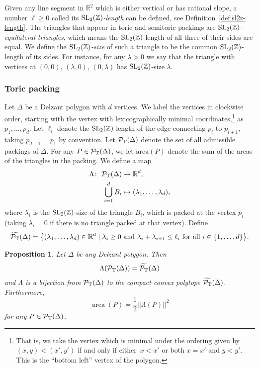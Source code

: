 \documentclass[10pt,a4paper]{amsart}
\numberwithin{equation}{section}
\newtheorem{Proposition}[Theorem]{Proposition}
\def\R{{\mathbb R}}
\def\Z{{\mathbb Z}}
\newcommand{\De}{\Delta}
\newcommand{\area}{\operatorname{area}}
\newcommand{\PT}{\mathcal{P}_{\rm T}}
\newcommand{\PTtilde}{\widetilde{\PT}}
\newcommand{\SL}{{\rm SL}_2(\Z)}
\theoremstyle{definition}
\theoremstyle{plain}
\theoremstyle{plain}
\begin{document}
Given any line segment in $\R^2$ which is either vertical or has rational slope, a number $\ell\geq 0$ called its \emph{$\SL$-length} can be defined, see Definition~\ref{def:sl2z-length}.
The triangles that appear in toric and semitoric packings are \emph{$\SL$-equilateral triangles}, which means the $\SL$-length of all three of their sides are equal. We define the \emph{$\SL$-size} of such a triangle to be the common $\SL$-length of its sides. For instance, for any $\lambda>0$ we say that the triangle with vertices at $(0,0)$, $(\lambda,0)$, $(0,\lambda)$ has $\SL$-size $\lambda$.

\subsubsection{Toric packing}
Let $\De$ be a Delzant polygon with $d$ vertices.
We label the vertices in clockwise order, starting with the vertex with lexicographically minimal coordinates,\footnote{That is, we take the vertex which is minimal under the ordering given by $(x,y)<(x',y')$ if and only if either~$x<x'$ or both $x=x'$ and $y< y'$. This is the ``bottom left'' vertex of the polygon.} as $p_1,\ldots,p_d$.
Let $\ell_i$ denote the $\SL$-length of the edge connecting $p_i$ to $p_{i+1}$, taking $p_{d+1} = p_1$ by convention.
Let $\PT(\De)$ denote the set of all admissible packings of $\De$.
For any $P\in\PT(\De)$, we let $\textrm{area}(P)$ denote the sum of the areas of the triangles in the packing.
We define a map
 \begin{align} \Lambda \colon\ \PT(\De) & \to \R^d, \label{eqn:Lambda} \\ \bigcup_{i=1}^d B_i & \mapsto (\lambda_1,\ldots, \lambda_d),\nonumber
\end{align}
 where $\lambda_i$ is the $\SL$-size of the triangle $B_i$, which is packed at the vertex $p_i$ (taking $\lambda_i=0$ if there is no triangle packed at that vertex).
Define
\begin{equation}\label{eqn:tildePT}
 \PTtilde(\De) = \big\{(\lambda_1,\ldots,\lambda_d)\in\R^d \mid \lambda_i\geq 0 \text{ and } \lambda_i+\lambda_{i+1}\leq \ell_i \text{ for all }i\in\{1,\ldots,d\}\big\}.
\end{equation}


\begin{Proposition}\label{prop:toric}
 Let $\De$ be any Delzant polygon. Then
 \[
 \Lambda(\PT(\De)) = \PTtilde(\De)
 \]
 and $\Lambda$ is a bijection from $\PT(\De)$ to the compact convex polytope $\PTtilde(\De)$.
 Furthermore,
 \begin{equation}\label{eqn:LambdaP-magnitude}
 \area(P) = \frac{1}{2}||\Lambda(P)||^2
 \end{equation}
 for any $P\in\PT(\De)$.
 \end{Proposition}
\end{document}
